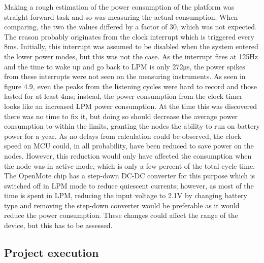 Making a rough estimation of the power consumption of the platform was straight forward task and so was measuring the actual consumption.
When comparing,
	the two the values differed by a factor of 30,
	which was not expected.
The reason probably originates from the clock interrupt which is triggered every 8ms.
Initially,
	this interrupt was assumed to be disabled when the system entered the lower power modes,
	but this was not the case.
As the interrupt fires at 125Hz and the time to wake up and go back to LPM is only 272μs,
	the power spikes from these interrupts were not seen on the measuring instruments.
As seen in figure 4.9,
	even the peaks from the listening cycles were hard to record and those lasted for at least 4ms;
	instead,
	the power consumption from the clock timer looks like an increased LPM power consumption.
At the time this was discovered there was no time to fix it,
	but doing so should decrease the average power consumption to within the limits,
	granting the nodes the ability to run on battery power for a year.
As no delays from calculation could be observed,
	the clock speed on MCU could,
	in all probability,
	have been reduced to save power on the nodes.
However,
	this reduction would only have affected the consumption when the node was in active mode,
	which is only a few percent of the total cycle time.
The OpenMote chip has a step-down DC-DC converter for this purpose which is switched off in LPM mode to reduce quiescent currents;
	however,
	as most of the time is spent in LPM,
	reducing the input voltage to 2.1V by changing battery type and removing the step-down converter would be preferable as it would reduce the power consumption.
These changes could affect the range of the device,
	but this has to be assessed.

\subsection{Project execution}

